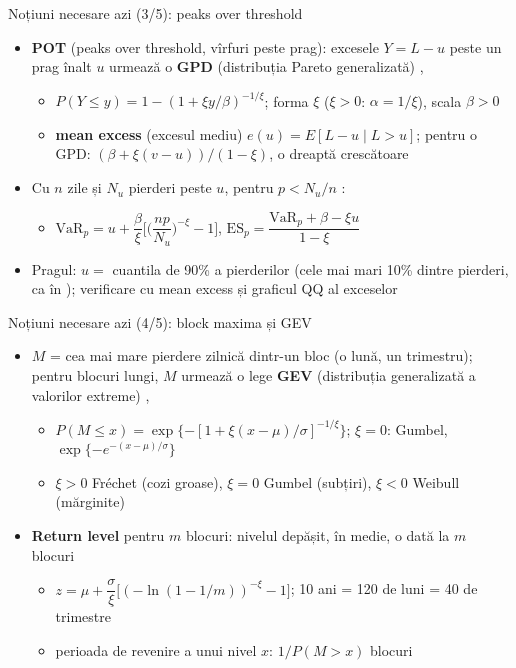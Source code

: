 \begin{frame}{Noțiuni necesare azi (3/5): peaks over threshold}
\itemsize{\small}
\begin{itemize}
    \item \textbf{POT} (peaks over threshold, vîrfuri peste prag): excesele $Y = L - u$ peste un prag înalt $u$ urmează o \textbf{GPD} (distribuția Pareto generalizată) , 
    \begin{itemize}
        \item $P(Y \le y) = 1 - (1 + \xi y/\beta)^{-1/\xi}$; forma $\xi$ ($\xi > 0$: $\alpha = 1/\xi$), scala $\beta > 0$
        \item \textbf{mean excess} (excesul mediu) $e(u) = E[L - u \mid L > u]$; pentru o GPD: $(\beta + \xi(v - u))/(1 - \xi)$, o dreaptă crescătoare
    \end{itemize}
    \item Cu $n$ zile și $N_u$ pierderi peste $u$, pentru $p < N_u/n$ :
    \begin{itemize}
        \item $\mathrm{VaR}_p = u + \dfrac{\beta}{\xi}\Big[\Big(\dfrac{np}{N_u}\Big)^{-\xi} - 1\Big]$, \quad $\mathrm{ES}_p = \dfrac{\mathrm{VaR}_p + \beta - \xi u}{1 - \xi}$
    \end{itemize}
    \item Pragul: $u =$ cuantila de 90\% a pierderilor (cele mai mari 10\% dintre pierderi, ca în ); verificare cu mean excess și graficul QQ al exceselor
\end{itemize}
\end{frame}

\begin{frame}{Noțiuni necesare azi (4/5): block maxima și GEV}
\itemsize{\small}
\begin{itemize}
    \item $M$ = cea mai mare pierdere zilnică dintr-un bloc (o lună, un trimestru); pentru blocuri lungi, $M$ urmează o lege \textbf{GEV} (distribuția generalizată a valorilor extreme) , 
    \begin{itemize}
        \item $P(M \le x) = \exp\{-[1 + \xi(x - \mu)/\sigma]^{-1/\xi}\}$; $\xi = 0$: Gumbel, $\exp\{-e^{-(x - \mu)/\sigma}\}$
        \item $\xi > 0$ Fréchet (cozi groase), $\xi = 0$ Gumbel (subțiri), $\xi < 0$ Weibull (mărginite)
    \end{itemize}
    \item \textbf{Return level} pentru $m$ blocuri: nivelul depășit, în medie, o dată la $m$ blocuri
    \begin{itemize}
        \item $z = \mu + \dfrac{\sigma}{\xi}\big[(-\ln(1 - 1/m))^{-\xi} - 1\big]$; 10 ani = 120 de luni = 40 de trimestre
        \item perioada de revenire a unui nivel $x$: $1/P(M > x)$ blocuri
    \end{itemize}
\end{itemize}
\end{frame}

